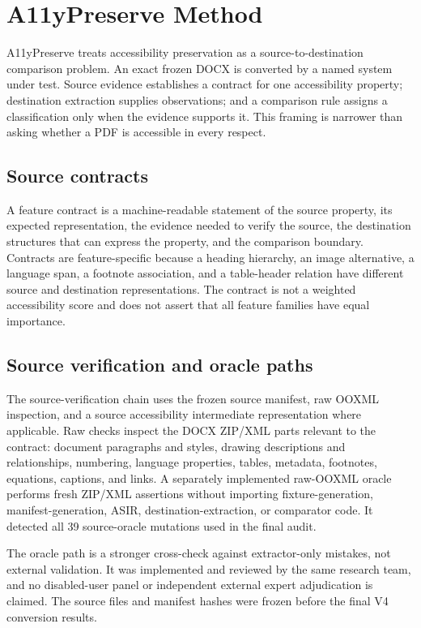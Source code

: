 \section{A11yPreserve Method}
\label{sec:method}

A11yPreserve treats accessibility preservation as a source-to-destination comparison problem. An exact frozen DOCX is converted by a named system under test. Source evidence establishes a contract for one accessibility property; destination extraction supplies observations; and a comparison rule assigns a classification only when the evidence supports it. This framing is narrower than asking whether a PDF is accessible in every respect.

\subsection{Source contracts}
A feature contract is a machine-readable statement of the source property, its expected representation, the evidence needed to verify the source, the destination structures that can express the property, and the comparison boundary. Contracts are feature-specific because a heading hierarchy, an image alternative, a language span, a footnote association, and a table-header relation have different source and destination representations. The contract is not a weighted accessibility score and does not assert that all feature families have equal importance.

\subsection{Source verification and oracle paths}
The source-verification chain uses the frozen source manifest, raw OOXML inspection, and a source accessibility intermediate representation where applicable. Raw checks inspect the DOCX ZIP/XML parts relevant to the contract: document paragraphs and styles, drawing descriptions and relationships, numbering, language properties, tables, metadata, footnotes, equations, captions, and links. A separately implemented raw-OOXML oracle performs fresh ZIP/XML assertions without importing fixture-generation, manifest-generation, ASIR, destination-extraction, or comparator code. It detected all 39 source-oracle mutations used in the final audit.

The oracle path is a stronger cross-check against extractor-only mistakes, not external validation. It was implemented and reviewed by the same research team, and no disabled-user panel or independent external expert adjudication is claimed. The source files and manifest hashes were frozen before the final V4 conversion results.

